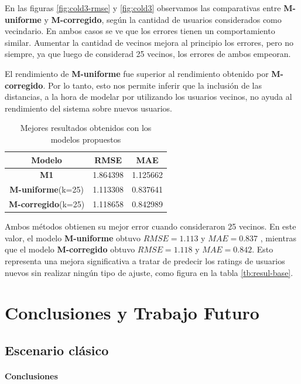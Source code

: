 \documentclass[hidelinks,12pt,a4paper]{book}
\theoremstyle{plain}
\theoremstyle{definition}
\begin{document}
En las figuras \ref{fig:cold3-rmse} y \ref{fig:cold3} observamos las comparativas entre \textbf{M-uniforme} y \textbf{M-corregido}, según la cantidad de usuarios considerados como vecindario. En ambos casos se ve que los errores tienen un comportamiento similar. Aumentar la cantidad de vecinos mejora al principio los errores, pero no siempre, ya que luego de considerad 25 vecinos, los errores de ambos empeoran.

El rendimiento de \textbf{M-uniforme} fue superior al rendimiento obtenido por \textbf{M-corregido}. Por lo tanto, esto nos permite inferir que la inclusión de las distancias, a la hora de modelar por utilizando los usuarios vecinos, no ayuda al rendimiento del sistema sobre nuevos usuarios.

\begin{table}[ht]
\centering
\begin{tabular}{|c|c c|}
\hline
Modelo & RMSE & MAE \\
\hline
\textbf{M1} & 1.864398 & 1.125662\\
\textbf{M-uniforme}(k=25) & 1.113308 & 0.837641 \\
\textbf{M-corregido}(k=25)& 1.118658 & 0.842989 \\
\hline
\end{tabular}
\caption{Mejores resultados obtenidos con los modelos propuestos}
\label{tb:resul-prop}
\end{table}

Ambos métodos obtienen su mejor error cuando consideraron 25 vecinos. En este valor, el modelo \textbf{M-uniforme} obtuvo $RMSE = 1.113$ y $MAE=0.837$ , mientras que el modelo \textbf{M-corregido} obtuvo $RMSE = 1.118$ y $MAE = 0.842$. Esto representa una mejora significativa a tratar de predecir los ratings de usuarios nuevos sin realizar ningún tipo de ajuste, como figura en la tabla \ref{tb:resul-base}.

\chapter{Conclusiones y Trabajo Futuro}

\section{Escenario clásico}

\subsubsection{Conclusiones}
\end{document}
